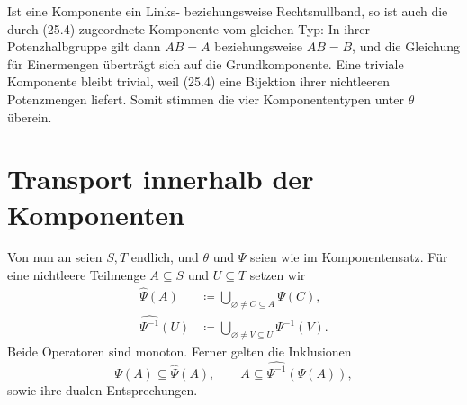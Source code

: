 \documentclass[main.tex]{subfiles}
\begin{document}
\begin{tabproofsplitwide}
  \setcounter{proofstepnr}{7}
  \closeproofpartwide
\end{tabproofsplitwide}
\endgroup

Ist eine Komponente ein Links- beziehungsweise Rechtsnullband, so ist auch
die durch (25.4) zugeordnete Komponente vom gleichen Typ: In ihrer
Potenzhalbgruppe gilt dann \(AB=A\) beziehungsweise \(AB=B\), und die
Gleichung für Einermengen überträgt sich auf die Grundkomponente.  Eine
triviale Komponente bleibt trivial, weil (25.4) eine Bijektion ihrer
nichtleeren Potenzmengen liefert.  Somit stimmen die vier Komponententypen
unter \(\theta\) überein.

\section{Transport innerhalb der Komponenten}

Von nun an seien \(S,T\) endlich, und \(\theta\) und \(\Psi\) seien wie
im Komponentensatz.  Für eine nichtleere Teilmenge \(A\subseteq S\) und
\(U\subseteq T\) setzen wir
\[
\begin{aligned}
 \widehat\Psi(A)
   &\coloneqq\bigcup_{\varnothing\neq C\subseteq A}\Psi(C),\\
 \widehat{\Psi^{-1}}(U)
   &\coloneqq\bigcup_{\varnothing\neq V\subseteq U}\Psi^{-1}(V).
\end{aligned}                                                   \tag{25.8}
\]
Beide Operatoren sind monoton.  Ferner gelten die Inklusionen
\[
 \Psi(A)\subseteq\widehat\Psi(A),
 \qquad
 A\subseteq\widehat{\Psi^{-1}}(\Psi(A)),
\]
sowie ihre dualen Entsprechungen.
\end{document}
